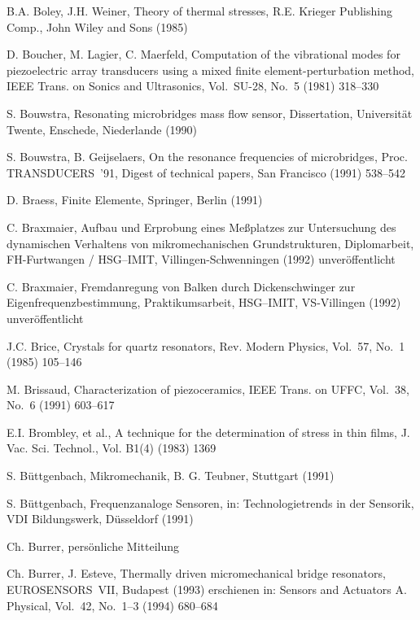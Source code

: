 \begin{thebibliography}{xxx}
 B.A. Boley, J.H. Weiner, Theory of thermal stresses, R.E. Krieger Publishing
 Comp., John Wiley and Sons (1985)

 D. Boucher, M. Lagier, C. Maerfeld, Computation of the vibrational modes
 for piezoelectric array transducers using a mixed finite
 element-perturbation method, IEEE Trans. on Sonics and Ultrasonics,
 Vol.~SU-28, No.~5 (1981) 318--330

 S. Bouwstra, Resonating microbridges mass flow sensor, Dissertation,
 Universität Twente, Enschede, Niederlande (1990)

 S. Bouwstra, B. Geijselaers, On the resonance frequencies of microbridges,
 Proc. TRANSDUCERS~'91, Digest of technical papers, San Francisco
 (1991) 538--542

 D. Braess, Finite Elemente, Springer, Berlin (1991)

 C. Braxmaier, Aufbau und Erprobung eines Meßplatzes zur Untersuchung des
 dynamischen Verhaltens von mikromechanischen Grundstrukturen,
 Diplomarbeit, FH-Furtwangen / HSG--IMIT, Villingen-Schwenningen (1992)
 unveröffentlicht

 C. Braxmaier, Fremdanregung von Balken durch Dickenschwinger zur
 Eigenfrequenzbestimmung, Praktikumsarbeit, HSG--IMIT, VS-Villingen (1992)
 unveröffentlicht

 J.C. Brice, Crystals for quartz resonators, Rev. Modern Physics,
 Vol.~57, No.~1 (1985) 105--146

 M. Brissaud, Characterization of piezoceramics, IEEE Trans. on UFFC,
 Vol.~38, No.~6 (1991) 603--617

 E.I. Brombley, et al., A technique for the determination of stress in thin
 films, J. Vac. Sci. Technol., Vol. B1(4) (1983) 1369

 S. Büttgenbach, Mikromechanik, B. G. Teubner, Stuttgart (1991)

 S. Büttgenbach, Frequenzanaloge Sensoren, in: Technologietrends in der
 Sensorik, VDI Bildungswerk, Düsseldorf (1991)

 Ch. Burrer, persönliche Mitteilung

 Ch. Burrer, J. Esteve, Thermally driven micromechanical bridge resonators,
 EUROSENSORS~VII, Budapest (1993) erschienen in: Sensors and Actuators A.
 Physical, Vol.~42, No.~1--3 (1994) 680--684


\end{thebibliography}
